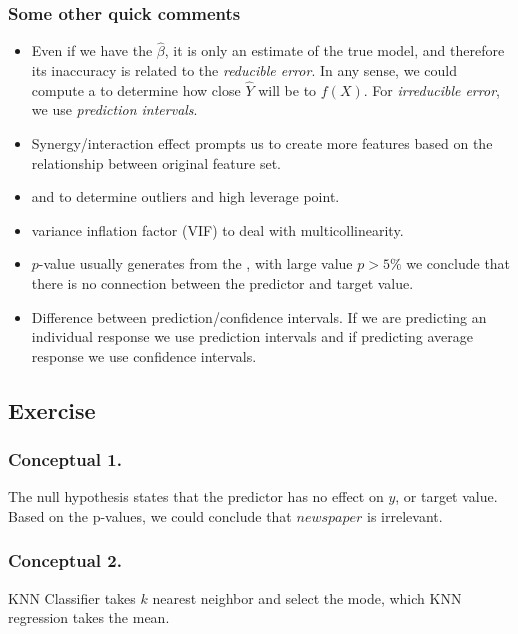 \subsubsection{Some other quick comments}
\begin{tbox}
	\begin{itemize}
	\item Even if we have the $\hat{\beta}$, it is only an estimate of the true model, and therefore its inaccuracy is related to the \textit{reducible error}. In any sense, we could compute a  to determine how close $\hat{Y}$ will be to $f(X)$. For \textit{irreducible error}, we use \textit{prediction intervals}.
	\item Synergy/interaction effect prompts us to create more features based on the relationship between original feature set.
	\item {} and  to determine outliers and high leverage point.  
	\item variance inflation factor (VIF) to deal with multicollinearity.
	\item $p$-value usually generates from the , with large value $p > 5\%$ we conclude that there is no connection between the predictor and target value.
	\item Difference between prediction/confidence intervals. If we are predicting an individual response we use prediction intervals and if predicting average response we use confidence intervals.
\end{itemize}
\end{tbox}

\subsection{Exercise}
\subsubsection{Conceptual 1.}
The null hypothesis states that the predictor has no effect on $y$, or target value. Based on the p-values, we could conclude that $newspaper$ is irrelevant. 
\subsubsection{Conceptual 2.}
KNN Classifier takes $k$ nearest neighbor and select the mode, which KNN regression takes the mean.
